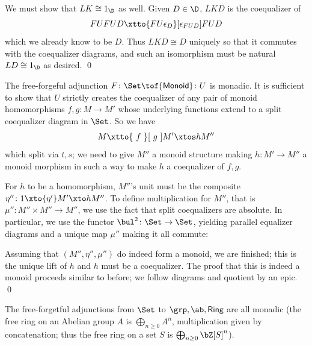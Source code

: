     We must show that $LK\cong1_\D$ as well.
    Given $D\in\D$, $LKD$ is the coequalizer of
    $$ FUFUD\xtto{FU\epsilon_D}[\epsilon_{FUD}]FUD $$
    which we already know to be $D$.
    Thus $LKD\cong D$ uniquely so that it commutes with the coequalizer diagrams, and such an isomorphism must be natural $LD\cong1_\D$ as desired.
    \qed

\eproof

\bexam

    The free-forgeful adjunction $F\colon\Set\tof{\sf Monoid}\colon U$ is monadic.
    It is sufficient to show that $U$ strictly creates the coequalizer of any pair of monoid homomorphisms $f,g\colon M\to M'$ whose underlying functions extend to a split coequalizer diagram in $\Set$.
    So we have
    $$ M\xtto{\ f\ }[\ g\ ]M'\xtos hM'' $$
    which split via $t,s$; we need to give $M''$ a monoid structure making $h\colon M'\to M''$ a monoid morphism in such a way to make $h$ a coequalizer of $f,g$.

    For $h$ to be a homomorphism, $M''$'s unit must be the composite $\eta''\colon1\xto{\eta'}M'\xto hM''$.
    To define multiplication for $M''$, that is $\mu''\colon M''\times M''\to M''$, we use the fact that split coequalizers are absolute.
    In particular, we use the functor $\bul^2\colon\Set\to\Set$, yielding parallel equalizer diagrams and a unique map $\mu''$ making it all commute:

    \centerline{}

    Assuming that $(M'',\eta'',\mu'')$ do indeed form a monoid, we are finished; this is the unique lift of $h$ and $h$ must be a coequalizer.
    The proof that this is indeed a monoid proceeds similar to before; we follow diagrams and quotient by an epic.
    \qed

\eexam

\bexam

    The free-forgetful adjunctions from $\Set$ to $\grp,\ab,{\sf Ring}$ are all monadic (the free ring on an Abelian group $A$ is $\bigoplus_{n\geq0}A^n$, multiplication given by concatenation;
    thus the free ring on a set $S$ is $\bigoplus_{n\geq0}\bZ[S]^n$).

